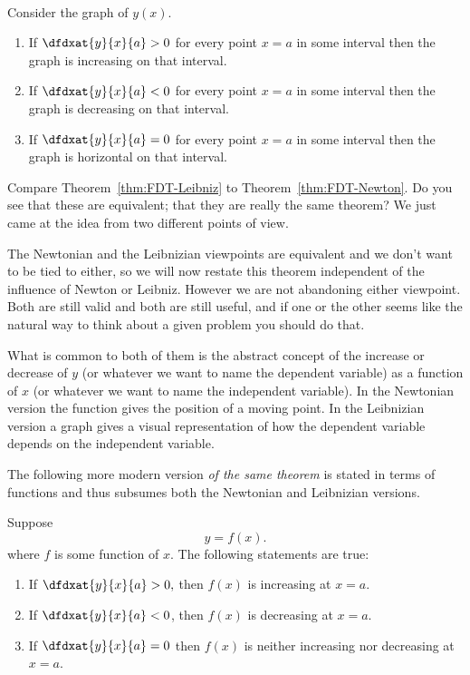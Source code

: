 \begin{mytheorem}\ \\
  \label{thm:FDT-Leibniz}
  Consider the graph of $y(x)$.
  \begin{enumerate}
  \item If $\dfdxat{y}{x}{a}>0$ for every point $x=a$ in some interval
    then the graph is increasing on that interval.
  \item If $\dfdxat{y}{x}{a}<0$ for every point $x=a$ in some interval
    then the graph is decreasing on that interval.
  \item If $\dfdxat{y}{x}{a}=0$ for every point $x=a$ in some interval
    then the graph is horizontal on that interval.
  \end{enumerate}
\end{mytheorem}
Compare Theorem~\ref{thm:FDT-Leibniz} to
Theorem~\ref{thm:FDT-Newton}. Do you see that these are equivalent;
that they are really the same theorem? We just came at the idea from two
different points of view.


 The Newtonian and the Leibnizian viewpoints are equivalent and we
don't want to be tied to either,  so we will now restate this theorem
independent of the influence of Newton or Leibniz.  However we are not
abandoning either viewpoint. Both are still valid and both are still useful, and
if one or the other seems like the natural way to think about a given
problem you should do that.

What is common to both of them is the abstract concept of the increase
or decrease of $y$ (or whatever we want to name the dependent
variable) as a function of $x$ (or whatever we want to name the
independent variable). In the Newtonian version the function gives the
position of a moving point. In the Leibnizian version a graph gives a
visual representation of how the dependent variable depends on the
independent variable.

The following  more modern version \emph{of the same theorem} is
stated in terms of functions and thus subsumes both the Newtonian and
Leibnizian versions.

\begin{mytheorem}
  \label{thm:FDT}
  Suppose 
  $$
  y=f(x).
  $$
  where $f$ is some function  of $x.$
  The following statements are true:
  \begin{enumerate}
  \item If $\dfdxat{y}{x}{a}>0,$ then $f(x)$ is increasing at
    $x=a$. 
  \item If $\dfdxat{y}{x}{a}<0$, then $f(x)$ 
    is decreasing at $x=a$.
  \item If $\dfdxat{y}{x}{a}=0$ then $f(x)$ is neither increasing
    nor decreasing at $x=a$.
  \end{enumerate}
\end{mytheorem}

